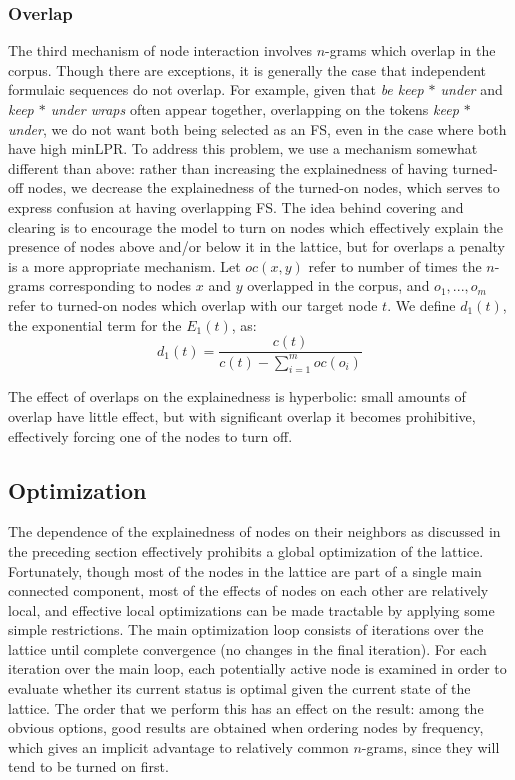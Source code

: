 \documentclass[11pt,letterpaper]{article}
\newcommand{\dotts}{...}
\newcommand{\gap}{$*$\xspace}
\newcommand{\ex}[1]{\textit{#1}\xspace}
\begin{document}
\subsubsection{Overlap}

The third mechanism of node interaction involves $n$-grams which overlap in the corpus. Though there are exceptions, it is generally the case that independent formulaic sequences do not overlap. For example, given that \ex{be keep \gap under} and \ex{keep \gap under wraps} often appear together, overlapping on the tokens \ex{keep \gap under}, we do not want both being selected as an FS, even in the case where both have high minLPR. To address this problem, we use a mechanism somewhat different than above: rather than increasing the explainedness of having turned-off nodes, we decrease the explainedness of the turned-on nodes, which serves to express confusion at having overlapping FS. The idea behind covering and clearing is to encourage the model to turn on nodes which effectively explain the presence of nodes above and/or below it in the lattice, but for overlaps a penalty is a more appropriate mechanism. Let $\mathit{oc}(x,y)$ refer to number of times the $n$-grams corresponding to nodes $x$ and $y$ overlapped in the corpus, and $o_1,\dotts,o_m$ refer to turned-on nodes which overlap with our target node $t$. We define $d_1(t)$, the exponential term for the $E_1(t)$, as:
\begin{displaymath}
	d_{1}(t) = \frac{c(t)}{c(t) - \sum_{i=1}^{m}{\mathit{oc}(o_i)}}
\end{displaymath}

The effect of overlaps on the explainedness is hyperbolic: small amounts of overlap have little effect, but with significant overlap it becomes prohibitive, effectively forcing one of the nodes to turn off. 

 
\subsection{Optimization}

The dependence of the explainedness of nodes on their neighbors as discussed in the preceding section effectively prohibits a global optimization of the lattice. Fortunately, though most of the nodes in the lattice are part of a single main connected component, most of the effects of nodes on each other are relatively local, and effective local optimizations can be made tractable by applying some simple restrictions. The main optimization loop consists of iterations over the lattice until complete convergence (no changes in the final iteration). For each iteration over the main loop, each potentially active node is examined in order to evaluate whether its current status is optimal given the current state of the lattice. The order that we perform this has an effect on the result: among the obvious options, good results are obtained when ordering nodes by frequency, which gives an implicit advantage to relatively common $n$-grams, since they will tend to be turned on first.
\end{document}
